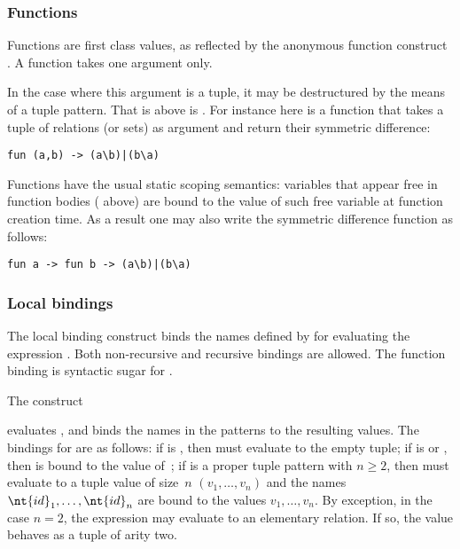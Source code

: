 \subsubsection*{Functions}
Functions are first class values, as reflected by the anonymous
function construct .
A function takes one argument only.

In the case where this argument is a tuple, it may be destructured
by the means of a tuple pattern. That is 
above is .
For instance here is a function that takes a tuple of
relations (or sets) as argument and return their symmetric difference:
\begin{verbatim}
fun (a,b) -> (a\b)|(b\a)
\end{verbatim}

Functions have the usual static scoping semantics:
variables that appear free in function bodies 
( above) are bound to
the value of such free variable at function creation time.
As a result one may also write the symmetric difference function
as follows:
\begin{verbatim}
fun a -> fun b -> (a\b)|(b\a)
\end{verbatim}

\subsubsection*{\label{bindings}Local bindings}
The local binding construct
binds the names defined by  
for evaluating the expression .
Both non-recursive and recursive bindings are allowed.
The function binding
 is syntactic sugar
for .

The construct
\begin{center}
  
\end{center}
evaluates ,
and binds the names in the patterns
 to the resulting values.
The bindings for  are as follows:
if  is \T{(}\T{)}, then  must evaluate to the empty
tuple;
if  is  or ,
then  is bound to the value of~;
if  is a proper tuple pattern
 with $n \geq 2$,
then  must evaluate to a tuple value of size~$n$
$(v_1,\ldots,v_n)$ and the names $\nt{id}_1,\ldots,\nt{id}_n$ are
bound to the values  $v_1,\ldots,v_n$.
By exception, in the case $n=2$, the expression  may evaluate to
an elementary relation. If so, the value behaves as a tuple of arity two.

